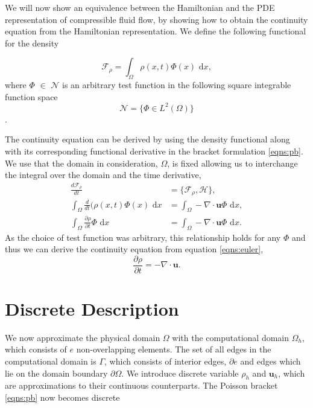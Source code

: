 \documentclass[a4paper,11pt]{article}
\begin{document}
We will now show an equivalence between the Hamiltonian and the PDE representation of compressible fluid flow, by showing how to obtain the continuity equation from the Hamiltonian representation. We define the following functional for the density

\[\mathcal{F}_\rho = \int_\Omega \rho (x,t) \Phi (x) \text{ d}x,\]
 where $\Phi$ $\in$ $\mathcal{N}$ is an arbitrary test function in the following square integrable function space
\[\mathcal{N} = \{ \Phi \in L^2(\Omega) \} \].

The continuity equation can be derived  by using the density functional along with its corresponding functional derivative in the bracket formulation \eqref{eqns:pb}.  We use that the domain in consideration, $\Omega$,  is fixed allowing us to interchange the  integral over the domain and the time derivative, 
\begin{equation}\label{functionalsderivs}
\begin{aligned}
\frac{d \mathcal{F}_\rho}{dt} &= \{\mathcal{F}_\rho, \mathcal{H} \},\\
\int_\Omega \frac{d}{dt}(\rho (x,t)  \Phi (x  ) \text{ d}x&=\int_\Omega - \nabla \cdot \mathbf{u} \Phi \text{ d}x,\\
\int_\Omega \frac{\partial \rho}{\partial t}\Phi  \text{ d}x&= \int_\Omega -\nabla \cdot \mathbf{u} \Phi \text{ d}x.
\end{aligned}
\end{equation}
As the choice of test function was arbitrary, this relationship holds for any $\Phi$ and thus we can derive the continuity equation  from equation \eqref{eqns:euler},
\begin{equation}
 \frac{\partial \rho}{\partial t} = - \nabla \cdot \mathbf{u}.
\end{equation}


\section{ Discrete Description}

 We now approximate the physical domain $\Omega$ with the computational domain $\Omega_h$, which consists of $e$ non-overlapping elements. The set of all edges in the computational domain is $\Gamma$, which consists of interior edges, $\partial e $ and edges which lie on the domain boundary $\partial \Omega$. We introduce discrete variable $\rho_h$ and $\mathbf{u}_h$, which are approximations to their continuous counterparts. The Poisson bracket \eqref{eqns:pb} now becomes discrete
\end{document}

